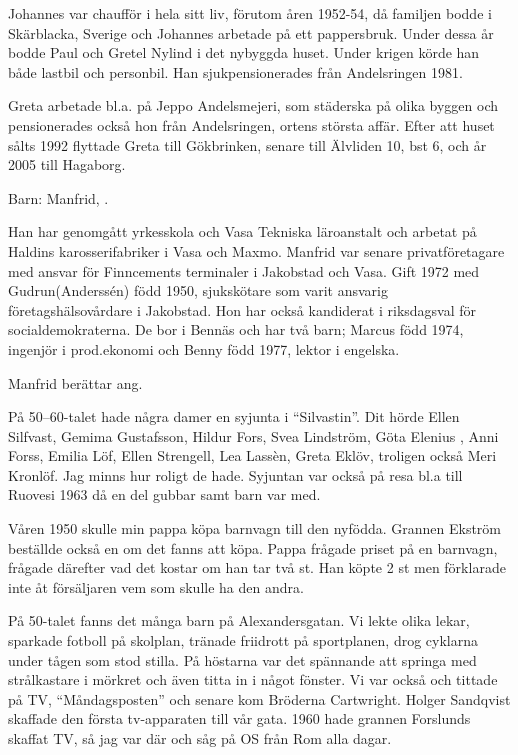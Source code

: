 Johannes var chaufför i hela sitt liv, förutom åren 1952-54, då familjen bodde i Skärblacka, Sverige och Johannes arbetade på ett pappersbruk. Under dessa år bodde Paul och Gretel Nylind i det nybyggda huset. Under krigen körde han både lastbil och personbil. Han sjukpensionerades från Andelsringen 1981.

Greta arbetade bl.a. på Jeppo Andelsmejeri, som städerska på olika byggen och pensionerades också hon från Andelsringen, ortens största affär. Efter att huset sålts 1992 flyttade Greta till Gökbrinken, senare till Älvliden 10, bst 6, och år 2005 till Hagaborg.

Barn: Manfrid, .

Han har genomgått yrkesskola och Vasa Tekniska läroanstalt och arbetat på Haldins karosserifabriker i Vasa och Maxmo. Manfrid var senare privatföretagare med ansvar för Finncements terminaler i Jakobstad och Vasa. Gift 1972 med Gudrun(Anderssén) född 1950, sjukskötare som varit ansvarig företagshälsovårdare i Jakobstad. Hon har också kandiderat i riksdagsval för socialdemokraterna. De bor i Bennäs och har två barn; Marcus född 1974, ingenjör i prod.ekonomi och Benny född 1977, lektor i engelska.

Manfrid berättar ang. 

På 50--60-talet hade några damer en syjunta i ``Silvastin''. Dit hörde Ellen Silfvast, Gemima Gustafsson, Hildur Fors, Svea Lindström, Göta Elenius , Anni Forss, Emilia Löf, Ellen Strengell, Lea Lassèn, Greta Eklöv, troligen också Meri Kronlöf. Jag minns hur roligt de hade. Syjuntan var också på resa bl.a till Ruovesi 1963 då en del gubbar samt barn var med.

Våren 1950 skulle min pappa köpa barnvagn till den nyfödda. Grannen Ekström beställde också en om det fanns att köpa. Pappa frågade priset på en barnvagn, frågade därefter vad det kostar om han tar två st. Han köpte 2 st men förklarade inte åt försäljaren vem som skulle ha den andra.

På 50-talet fanns det många barn på Alexandersgatan. Vi lekte olika lekar, sparkade fotboll på skolplan, tränade friidrott på sportplanen, drog cyklarna under tågen som stod stilla. På höstarna var det spännande att springa med strålkastare i mörkret och även titta in i något fönster. Vi var också och tittade på TV, ``Måndagsposten''  och senare kom Bröderna Cartwright. Holger Sandqvist skaffade den första tv-apparaten till vår gata. 1960 hade grannen Forslunds skaffat TV, så jag var där och såg på OS från Rom alla dagar.

